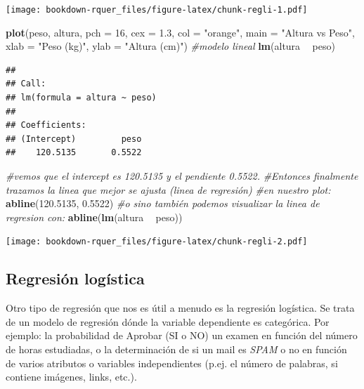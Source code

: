 \documentclass[]{book}
\newenvironment{Shaded}{\begin{snugshade}}{\end{snugshade}}
\newcommand{\CommentTok}[1]{\textcolor[rgb]{0.56,0.35,0.01}{\textit{#1}}}
\newcommand{\DataTypeTok}[1]{\textcolor[rgb]{0.13,0.29,0.53}{#1}}
\newcommand{\DecValTok}[1]{\textcolor[rgb]{0.00,0.00,0.81}{#1}}
\newcommand{\FloatTok}[1]{\textcolor[rgb]{0.00,0.00,0.81}{#1}}
\newcommand{\KeywordTok}[1]{\textcolor[rgb]{0.13,0.29,0.53}{\textbf{#1}}}
\newcommand{\NormalTok}[1]{#1}
\newcommand{\OperatorTok}[1]{\textcolor[rgb]{0.81,0.36,0.00}{\textbf{#1}}}
\newcommand{\StringTok}[1]{\textcolor[rgb]{0.31,0.60,0.02}{#1}}
\theoremstyle{definition}
\theoremstyle{definition}
\theoremstyle{definition}
\theoremstyle{remark}
\begin{document}
\texttt{[image: bookdown-rquer\_files/figure-latex/chunk-regli-1.pdf]}

\begin{Shaded}
\begin{Highlighting}[]
\KeywordTok{plot}\NormalTok{(peso, altura, }\DataTypeTok{pch =} \DecValTok{16}\NormalTok{, }\DataTypeTok{cex =} \FloatTok{1.3}\NormalTok{, }\DataTypeTok{col =} \StringTok{"orange"}\NormalTok{, }
     \DataTypeTok{main =} \StringTok{"Altura vs Peso"}\NormalTok{, }
     \DataTypeTok{xlab =} \StringTok{"Peso (kg)"}\NormalTok{, }
     \DataTypeTok{ylab =} \StringTok{"Altura (cm)"}\NormalTok{)}
\CommentTok{#modelo lineal}
\KeywordTok{lm}\NormalTok{(altura }\OperatorTok{~}\StringTok{ }\NormalTok{peso) }
\end{Highlighting}
\end{Shaded}

\begin{verbatim}
## 
## Call:
## lm(formula = altura ~ peso)
## 
## Coefficients:
## (Intercept)         peso  
##    120.5135       0.5522
\end{verbatim}

\begin{Shaded}
\begin{Highlighting}[]
\CommentTok{#vemos que el intercept es 120.5135 y el pendiente 0.5522. }
\CommentTok{#Entonces finalmente trazamos la linea que mejor se ajusta (linea de regresión) }
\CommentTok{#en nuestro plot:}
\KeywordTok{abline}\NormalTok{(}\FloatTok{120.5135}\NormalTok{, }\FloatTok{0.5522}\NormalTok{)}
\CommentTok{#o sino también podemos visualizar la linea de regresion con:}
\KeywordTok{abline}\NormalTok{(}\KeywordTok{lm}\NormalTok{(altura }\OperatorTok{~}\StringTok{ }\NormalTok{peso))}
\end{Highlighting}
\end{Shaded}

\texttt{[image: bookdown-rquer\_files/figure-latex/chunk-regli-2.pdf]}

\hypertarget{regresion-logistica}{%
\subsection{Regresión logística}\label{regresion-logistica}}

Otro tipo de regresión que nos es útil a menudo es la regresión
logística. Se trata de un modelo de regresión dónde la variable
dependiente es categórica. Por ejemplo: la probabilidad de Aprobar (SI o
NO) un examen en función del número de horas estudiadas, o la
determinación de si un mail es \emph{SPAM} o no en función de varios
atributos o variables independientes (p.ej. el número de palabras, si
contiene imágenes, links, etc.).
\end{document}
